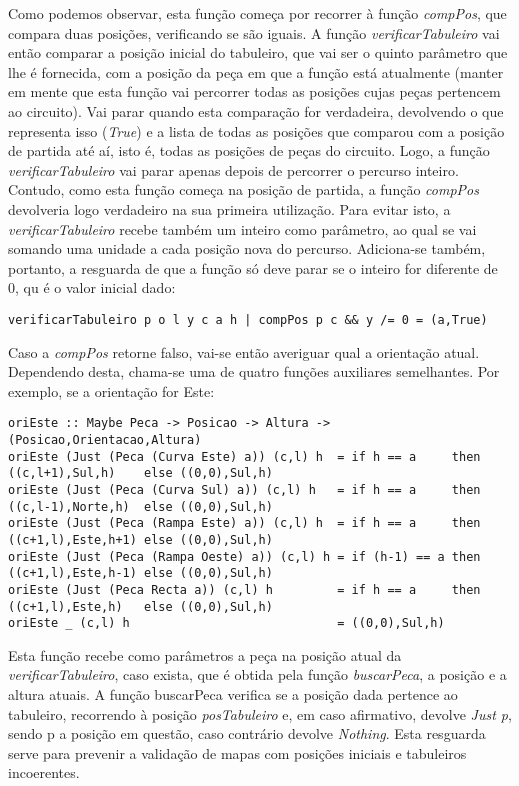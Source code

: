 \documentclass[a4paper]{report}
\begin{document}
Como podemos observar, esta função começa por recorrer à função \textit{compPos}, que compara duas posições, verificando se são iguais. A função \textit{verificarTabuleiro} vai então comparar a posição inicial do tabuleiro, que vai ser o quinto parâmetro que lhe é fornecida, com a posição da peça em que a função está atualmente (manter em mente que esta função vai percorrer todas as posições cujas peças pertencem ao circuito). Vai parar quando esta comparação for verdadeira, devolvendo o  que representa isso (\textit{True}) e a lista de todas as posições que comparou com a posição de partida até aí, isto é, todas as posições de peças do circuito. Logo, a função \textit{verificarTabuleiro} vai parar apenas depois de percorrer o percurso inteiro. Contudo, como esta função começa na posição de partida, a função \textit{compPos} devolveria logo verdadeiro na sua primeira utilização. Para evitar isto, a \textit{verificarTabuleiro} recebe também um inteiro como parâmetro, ao qual se vai somando uma unidade a cada posição nova do percurso. Adiciona-se também, portanto, a resguarda de que a função só deve parar se o inteiro for diferente de 0, qu é o valor inicial dado:

\begin{verbatim}
verificarTabuleiro p o l y c a h | compPos p c && y /= 0 = (a,True) 
\end{verbatim}

Caso a \textit{compPos} retorne falso, vai-se então averiguar qual a orientação atual. Dependendo desta, chama-se uma de quatro funções auxiliares semelhantes. Por exemplo, se a orientação for Este:

\begin{lstlisting}
oriEste :: Maybe Peca -> Posicao -> Altura -> (Posicao,Orientacao,Altura)
oriEste (Just (Peca (Curva Este) a)) (c,l) h  = if h == a     then ((c,l+1),Sul,h)    else ((0,0),Sul,h)
oriEste (Just (Peca (Curva Sul) a)) (c,l) h   = if h == a     then ((c,l-1),Norte,h)  else ((0,0),Sul,h)
oriEste (Just (Peca (Rampa Este) a)) (c,l) h  = if h == a     then ((c+1,l),Este,h+1) else ((0,0),Sul,h)
oriEste (Just (Peca (Rampa Oeste) a)) (c,l) h = if (h-1) == a then ((c+1,l),Este,h-1) else ((0,0),Sul,h)
oriEste (Just (Peca Recta a)) (c,l) h         = if h == a     then ((c+1,l),Este,h)   else ((0,0),Sul,h)
oriEste _ (c,l) h                             = ((0,0),Sul,h)
\end{lstlisting}

Esta função recebe como parâmetros a peça na posição atual da \textit{verificarTabuleiro}, caso exista, que é obtida pela função \textit{buscarPeca}, a posição e a altura atuais. A função buscarPeca verifica se a posição dada pertence ao tabuleiro, recorrendo à posição \textit{posTabuleiro} e, em caso afirmativo, devolve \textit{Just p}, sendo p a posição em questão, caso contrário devolve \textit{Nothing}. Esta resguarda serve para prevenir a validação de mapas com posições iniciais e tabuleiros incoerentes.
\end{document}
